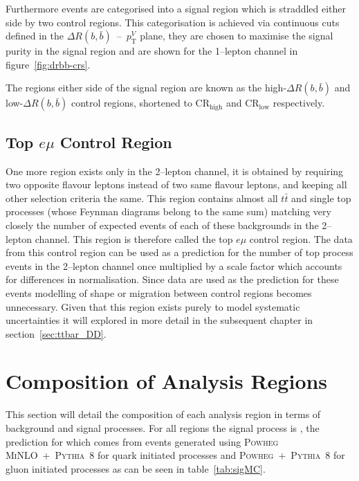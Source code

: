 Furthermore events are categorised into a signal region which is straddled
either side by two control regions. This categorisation is achieved via
continuous cuts defined in the $\Delta R(b, \bar{b})$~--~$p_{\mathrm{T}}^{V}$ plane,
they are chosen to maximise the signal purity in the signal region and are shown
for the 1--lepton channel in figure~\ref{fig:drbb-crs}.

The regions either side of the signal region are known as the
high-$\Delta R(b, \bar{b})$ and low-$\Delta R(b, \bar{b})$ control regions,
shortened to CR$_{\text{high}}$ and CR$_{\text{low}}$ respectively.

\subsection{Top \texorpdfstring{$e \mu$}{e mu} Control Region}%
\label{sec:topemucr}

One more region exists only in the 2--lepton channel, it is obtained by
requiring two opposite flavour leptons instead of two same flavour leptons, and
keeping all other selection criteria the same. This region contains almost all
$t\bar{t}$ and single top processes (whose Feynman diagrams belong to the same
sum) matching very closely the number of expected events of each of these
backgrounds in the 2--lepton channel. This region is therefore called the top $e
\mu$ control region. The data from this control region can be used as a
prediction for the number of top process events in the 2--lepton channel once
multiplied by a scale factor which accounts for differences in normalisation.
Since data are used as the prediction for these events modelling of shape or
migration between control regions becomes unnecessary. Given that this region
exists purely to model systematic uncertainties it will explored in more detail
in the subsequent chapter in section~\ref{sec:ttbar_DD}.

\section{Composition of Analysis Regions}
\label{sec:composition}

This section will detail the composition of each analysis region in terms of
background and signal processes. For all regions the signal process is
\VHbb, the prediction for which comes from events generated using \textsc{Powheg
  MiNLO}~+~\textsc{Pythia~8} for quark initiated processes and
\textsc{Powheg}~+~\textsc{Pythia~8} for gluon initiated processes as can be seen
in table~\ref{tab:sigMC}.


